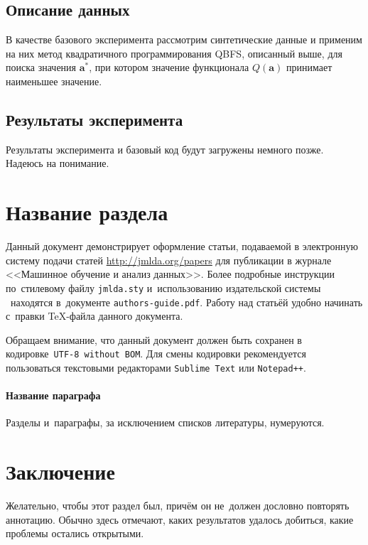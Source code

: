 \documentclass[12pt, twoside]{article}
\newcommand{\ba}{\mathbf{a}}
\begin{document}
\subsection{Описание данных}

В качестве базового эксперимента рассмотрим синтетические данные и применим на них метод квадратичного программирования QBFS, описанный выше, для поиска значения $\ba^*$, при котором значение функционала $Q(\ba)$ принимает наименьшее значение.

\subsection{Результаты эксперимента}

Результаты эксперимента и базовый код будут загружены немного позже. Надеюсь на понимание.





\section{Название раздела}
Данный документ демонстрирует оформление статьи,
подаваемой в электронную систему подачи статей \url{http://jmlda.org/papers} для публикации в журнале <<Машинное обучение и анализ данных>>.
Более подробные инструкции по~стилевому файлу \texttt{jmlda.sty} и~использованию издательской системы \LaTeXe\
находятся в~документе \texttt{authors-guide.pdf}.
Работу над статьёй удобно начинать с~правки \TeX-файла данного документа.

Обращаем внимание, что данный документ должен быть сохранен в кодировке~\verb'UTF-8 without BOM'.
Для смены кодировки рекомендуется пользоваться текстовыми редакторами \verb'Sublime Text' или \verb'Notepad++'.

\paragraph{Название параграфа}
Разделы и~параграфы, за исключением списков литературы, нумеруются.

\section{Заключение}
Желательно, чтобы этот раздел был, причём он не~должен дословно повторять аннотацию.
Обычно здесь отмечают, каких результатов удалось добиться, какие проблемы остались открытыми.




\end{document}
